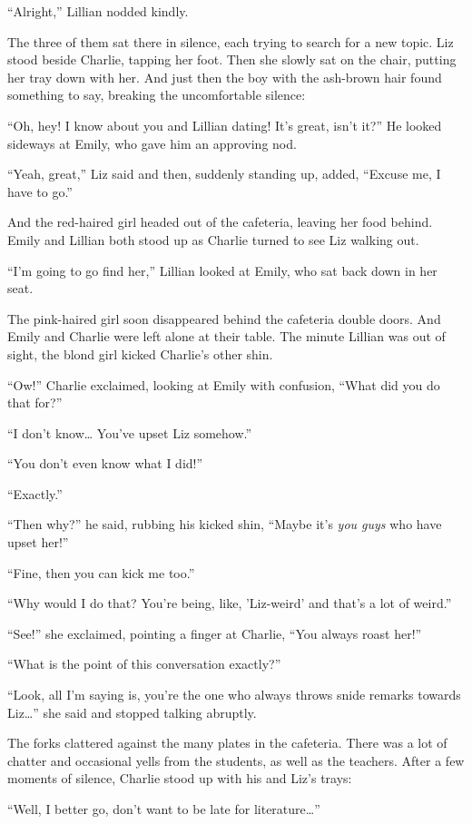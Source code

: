 “Alright,” Lillian nodded kindly.

The three of them sat there in silence, each trying to search for a new topic. Liz stood beside Charlie, tapping her foot. Then she slowly sat on the chair, putting her tray down with her. And just then the boy with the ash-brown hair found something to say, breaking the uncomfortable silence:

“Oh, hey! I know about you and Lillian dating! It's great, isn't it?” He looked sideways at Emily, who gave him an approving nod.

“Yeah, great,” Liz said and then, suddenly standing up, added, “Excuse me, I have to go.”

And the red-haired girl headed out of the cafeteria, leaving her food behind. Emily and Lillian both stood up as Charlie turned to see Liz walking out.

“I'm going to go find her,” Lillian looked at Emily, who sat back down in her seat.

The pink-haired girl soon disappeared behind the cafeteria double doors. And Emily and Charlie were left alone at their table. The minute Lillian was out of sight, the blond girl kicked Charlie's other shin.

“Ow!” Charlie exclaimed, looking at Emily with confusion, “What did you do that for?”

“I don't know… You've upset Liz somehow.”

“You don't even know what I did!”

“Exactly.”

“Then why?” he said, rubbing his kicked shin, “Maybe it's \textit{you guys} who have upset her!”

“Fine, then you can kick me too.”

“Why would I do that? You're being, like, 'Liz-weird' and that's a lot of weird.”

“See!” she exclaimed, pointing a finger at Charlie, “You always roast her!”

“What is the point of this conversation exactly?”

“Look, all I'm saying is, you're the one who always throws snide remarks towards Liz…” she said and stopped talking abruptly.

The forks clattered against the many plates in the cafeteria. There was a lot of chatter and occasional yells from the students, as well as the teachers. After a few moments of silence, Charlie stood up with his and Liz's trays:

“Well, I better go, don't want to be late for literature…”

